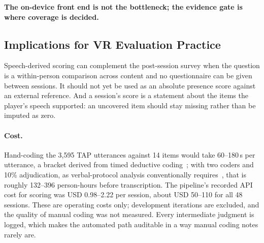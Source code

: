 \textbf{The on-device front end is not the bottleneck; the evidence gate is where coverage is decided.}

\subsection{Implications for VR Evaluation Practice}

Speech-derived scoring can complement the post-session survey when the question is a within-person comparison across content and no questionnaire can be given between sessions. It should not yet be used as an absolute presence score against an external reference. And a session's score is a statement about the items the player's speech supported: an uncovered item should stay missing rather than be imputed as zero.

\paragraph{Cost.}
Hand-coding the 3{,}595 TAP utterances against 14 items would take 60--180\,s per utterance, a bracket derived from timed deductive coding~\cite{chew2023llm}; with two coders and 10\% adjudication, as verbal-protocol analysis conventionally requires~\cite{chi1997quantifying}, that is roughly 132--396 person-hours before transcription. The pipeline's recorded API cost for scoring was USD 0.98--2.22 per session, about USD 50--110 for all 48 sessions. These are operating costs only; development iterations are excluded, and the quality of manual coding was not measured. Every intermediate judgment is logged, which makes the automated path auditable in a way manual coding notes rarely are.
